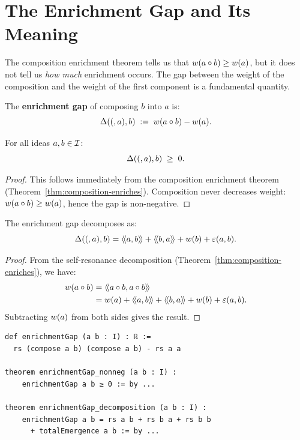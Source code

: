 \section{The Enrichment Gap and Its Meaning}

The composition enrichment theorem tells us that $w(a \circ b) \geq w(a)$,
but it does not tell us \emph{how much} enrichment occurs. The gap between the
weight of the composition and the weight of the first component is a fundamental
quantity.

\begin{definition}
\label{def:enrichment-gap}
The \textbf{enrichment gap} of composing $b$ into $a$ is:
\[
  \Delta((,a),b) \;:=\; w(a \circ b) - w(a).
\]
\end{definition}

\begin{theorem}
\label{thm:enrichment-gap-nonneg}
For all ideas $a, b \in \mathcal{I}$:
\[
  \Delta((,a),b) \;\geq\; 0.
\]
\end{theorem}

\begin{proof}
This follows immediately from the composition enrichment theorem
(Theorem~\ref{thm:composition-enriches}). Composition never decreases weight:
$w(a \circ b) \geq w(a)$, hence the gap is non-negative.
\end{proof}

\begin{theorem}
\label{thm:enrichment-gap-decomposition}
The enrichment gap decomposes as:
\[
  \Delta((,a),b) = \langle\!\langle a, b \rangle\!\rangle + \langle\!\langle b, a \rangle\!\rangle + w(b) + \varepsilon(a,b).
\]
\end{theorem}

\begin{proof}
From the self-resonance decomposition (Theorem~\ref{thm:composition-enriches}),
we have:
\begin{align*}
w(a \circ b) &= \langle\!\langle a \circ b, a \circ b \rangle\!\rangle \\
&= w(a) + \langle\!\langle a, b \rangle\!\rangle + \langle\!\langle b, a \rangle\!\rangle + w(b) + \varepsilon(a,b).
\end{align*}
Subtracting $w(a)$ from both sides gives the result.
\end{proof}

\begin{lstlisting}[caption={Enrichment gap (IDT\_v3\_Emergence.lean)}]
def enrichmentGap (a b : I) : ℝ :=
  rs (compose a b) (compose a b) - rs a a

theorem enrichmentGap_nonneg (a b : I) :
    enrichmentGap a b ≥ 0 := by ...

theorem enrichmentGap_decomposition (a b : I) :
    enrichmentGap a b = rs a b + rs b a + rs b b
      + totalEmergence a b := by ...
\end{lstlisting}

